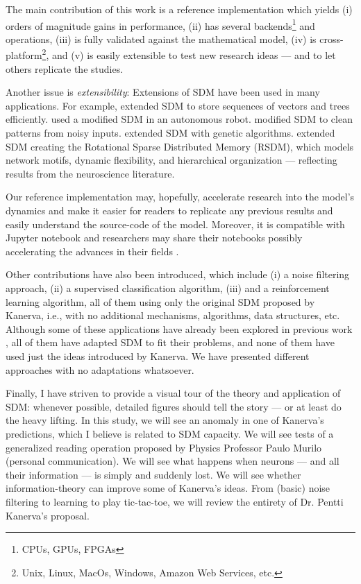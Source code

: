The main contribution of this work is a reference implementation which yields (i) orders of magnitude gains in performance, (ii) has several backends\footnote{CPUs, GPUs, FPGAs} and operations, (iii) is fully validated against the mathematical model, (iv) is cross-platform\footnote{Unix, Linux, MacOs, Windows, Amazon Web Services, etc.}, and (v) is easily extensible to test new research ideas --- and to let others replicate the studies.

Another issue is \emph{extensibility}: Extensions of SDM have been used in many applications. For example, \citet{Snaider2011} extended SDM to store sequences of vectors and trees efficiently.  \citet{Rajesh1998} used a modified SDM in an autonomous robot. \citet{Meng2009} modified SDM to clean patterns from noisy inputs. \citet{fan1997genetic} extended SDM with genetic algorithms. \citet{chada2016you} extended SDM creating the Rotational Sparse Distributed Memory (RSDM), which models network motifs, dynamic flexibility, and hierarchical organization --- reflecting results from the neuroscience literature.

Our reference implementation may, hopefully, accelerate research into the model's dynamics and make it easier for readers to replicate any previous results and easily understand the source-code of the model.  Moreover, it is compatible with Jupyter notebook and researchers may share their notebooks possibly accelerating the advances in their fields \citep{shen2014interactive}.

Other contributions have also been introduced, which include (i) a noise filtering approach, (ii) a supervised classification algorithm, (iii) and a reinforcement learning algorithm, all of them using only the original SDM proposed by Kanerva, i.e., with no additional mechanisms, algorithms, data structures, etc. Although some of these applications have already been explored in previous work \citep{Meng2009, fan1997genetic, rao1995natural}, all of them have adapted SDM to fit their problems, and none of them have used just the ideas introduced by Kanerva. We have presented different approaches with no adaptations whatsoever.

Finally, I have striven to provide a visual tour of the theory and application of SDM: whenever possible, detailed figures should tell the story --- or at least do the heavy lifting. In this study, we will see an anomaly in one of Kanerva's predictions, which I believe is related to SDM capacity. We will see tests of a generalized reading operation proposed by Physics Professor Paulo Murilo (personal communication).  We will see what happens when neurons --- and
all their information --- is simply and suddenly lost.  We will see whether information-theory can improve some of Kanerva's ideas.  From (basic) noise filtering to learning to play tic-tac-toe, we will review the entirety of Dr. Pentti Kanerva's proposal.


